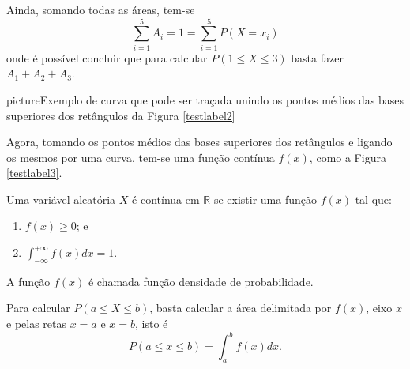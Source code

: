 \documentclass[11pt,fleqn]{book}
\numberwithin{mpicture}{chapter}
\numberwithin{mtable}{chapter}
\numberwithin{mframe}{chapter}
\begin{document}
Ainda, somando todas as áreas, tem-se
\[
	\sum_{i=1}^{5} A_i = 1 = \sum_{i=1}^{5} P(X=x_i)
\]
onde é possível concluir que para calcular $P(1\leqslant X \leqslant 3)$ basta fazer $A_1 + A_2 + A_3$.
\newpage

\begin{sidepicture}{0cm}{picture}{Exemplo de curva que pode ser traçada unindo os pontos médios das bases superiores dos retângulos da Figura \ref{testlabel2}}
	\label{testlabel3}
\end{sidepicture}

Agora, tomando os pontos médios das bases superiores dos retângulos e ligando os mesmos por uma curva, tem-se uma função contínua $f(x)$, como a Figura \ref{testlabel3}.

\begin{definition}
	Uma variável aleatória $X$ é contínua em $\mathbb{R}$ se existir uma função $f(x)$ tal que:
	\begin{enumerate}[label={\roman*)}]
		\item $f(x) \geqslant 0$; e
		\item $\displaystyle \int_{-\infty}^{+\infty} f(x)dx = 1$.
	\end{enumerate}
	
	A função $f(x)$ é chamada função densidade de probabilidade.
\end{definition}

\begin{remark}
	Para calcular $P(a\leqslant X \leqslant b)$, basta calcular a área delimitada por $f(x)$, eixo $x$ e pelas retas $x=a$ e $x=b$, isto é
	\begin{equation}
		P(a\leqslant x \leqslant b) = \int_{a}^{b} f(x)dx
		\text{.}
	\end{equation}
\end{remark}
\end{document}
